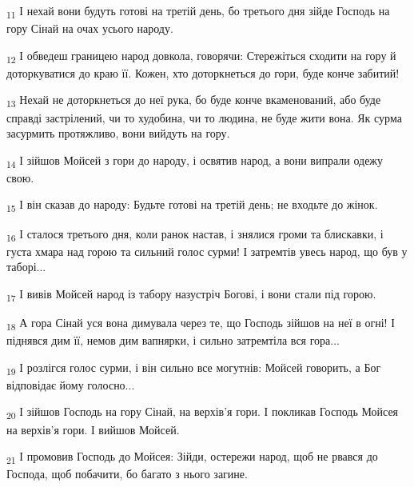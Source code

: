 \begin{tcolorbox}
\textsubscript{11} І нехай вони будуть готові на третій день, бо третього дня зійде Господь на гору Сінай на очах усього народу.
\end{tcolorbox}
\begin{tcolorbox}
\textsubscript{12} І обведеш границею народ довкола, говорячи: Стережіться сходити на гору й доторкуватися до краю її. Кожен, хто доторкнеться до гори, буде конче забитий!
\end{tcolorbox}
\begin{tcolorbox}
\textsubscript{13} Нехай не доторкнеться до неї рука, бо буде конче вкаменований, або буде справді застрілений, чи то худобина, чи то людина, не буде жити вона. Як сурма засурмить протяжливо, вони вийдуть на гору.
\end{tcolorbox}
\begin{tcolorbox}
\textsubscript{14} І зійшов Мойсей з гори до народу, і освятив народ, а вони випрали одежу свою.
\end{tcolorbox}
\begin{tcolorbox}
\textsubscript{15} І він сказав до народу: Будьте готові на третій день; не входьте до жінок.
\end{tcolorbox}
\begin{tcolorbox}
\textsubscript{16} І сталося третього дня, коли ранок настав, і знялися громи та блискавки, і густа хмара над горою та сильний голос сурми! І затремтів увесь народ, що був у таборі...
\end{tcolorbox}
\begin{tcolorbox}
\textsubscript{17} І вивів Мойсей народ із табору назустріч Богові, і вони стали під горою.
\end{tcolorbox}
\begin{tcolorbox}
\textsubscript{18} А гора Сінай уся вона димувала через те, що Господь зійшов на неї в огні! І піднявся дим її, немов дим вапнярки, і сильно затремтіла вся гора...
\end{tcolorbox}
\begin{tcolorbox}
\textsubscript{19} І розлігся голос сурми, і він сильно все могутнів: Мойсей говорить, а Бог відповідає йому голосно...
\end{tcolorbox}
\begin{tcolorbox}
\textsubscript{20} І зійшов Господь на гору Сінай, на верхів'я гори. І покликав Господь Мойсея на верхів'я гори. І вийшов Мойсей.
\end{tcolorbox}
\begin{tcolorbox}
\textsubscript{21} І промовив Господь до Мойсея: Зійди, остережи народ, щоб не рвався до Господа, щоб побачити, бо багато з нього загине.
\end{tcolorbox}
